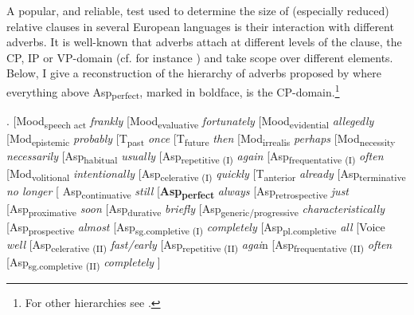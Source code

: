 \documentclass [output=book,colorlinks,citecolor=brown]{langscibook}
\begin{document}
A popular, and reliable, test used to determine the size of (especially reduced) relative clauses in several European languages is their interaction with different adverbs. It is well-known that adverbs attach at different levels of the clause, the CP, IP or VP-domain (cf. for instance \citealt{ramchand:2014:deriving}) and take scope over different elements. Below, I give a reconstruction of the hierarchy of adverbs proposed by \citet[109]{cinque:1999:adverbs} where everything above Asp\textsubscript{perfect}, marked in boldface, is the CP-domain.\footnote{For other hierarchies see \citet{laenzlinger:2011:elements, morzycki:2016:mod}.} %

\newpage

\ex. [Mood\textsubscript{speech act} \textit{frankly} [Mood\textsubscript{evaluative} \textit{fortunately} [Mood\textsubscript{evidential} \textit{allegedly} [Mod\textsubscript{epistemic} \textit{probably} [T\textsubscript{past} \textit{once} [T\textsubscript{future} \textit{then} [Mod\textsubscript{irrealis} \textit{perhaps} [Mod\textsubscript{necessity} \textit{necessarily} [Asp\textsubscript{habitual} \textit{usually} [Asp\textsubscript{repetitive (I)} \textit{again} [Asp\textsubscript{frequentative (I)} \textit{often} [Mod\textsubscript{volitional} \textit{intentionally} [Asp\textsubscript{celerative (I)} \textit{quickly} [T\textsubscript{anterior} \textit{already} [Asp\textsubscript{terminative} \textit{no longer} [ Asp\textsubscript{continuative} \textit{still} [\textbf{Asp\textsubscript{perfect}} \textit{always} [Asp\textsubscript{retrospective} \textit{just} [Asp\textsubscript{proximative} \textit{soon} [Asp\textsubscript{durative} \textit{briefly} [Asp\textsubscript{generic/progressive} \textit{characteristically} [Asp\textsubscript{prospective} \textit{almost} [Asp\textsubscript{sg.completive (I)} \textit{completely} [Asp\textsubscript{pl.completive} \textit{all} [Voice \textit{well} [Asp\textsubscript{celerative (II)} \textit{fast/early} [Asp\textsubscript{repetitive (II)} \textit{agai}n [Asp\textsubscript{frequentative (II)} \textit{often} [Asp\textsubscript{sg.completive (II)} \textit{completely} ]
\end{document}
